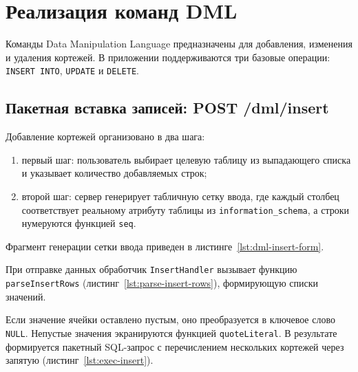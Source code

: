\section{Реализация команд DML}
\label{sec:dml}

Команды Data Manipulation Language предназначены для добавления, изменения и удаления кортежей. В приложении поддерживаются три базовые операции: \texttt{INSERT INTO}, \texttt{UPDATE} и \texttt{DELETE}.

\subsection{Пакетная вставка записей: POST /dml/insert}

Добавление кортежей организовано в два шага:
\begin{enumerate}
    \item первый шаг: пользователь выбирает целевую таблицу из выпадающего списка и указывает количество добавляемых строк;
    \item второй шаг: сервер генерирует табличную сетку ввода, где каждый столбец соответствует реальному атрибуту таблицы из \texttt{information\_schema}, а строки нумеруются функцией \texttt{seq}.
\end{enumerate}

Фрагмент генерации сетки ввода приведен в листинге~\ref{lst:dml-insert-form}.

\begin{listing}[H]
    \caption{Генерация динамической сетки ввода кортежей в \texttt{templates/dml.html}}
    \label{lst:dml-insert-form}
\end{listing}

При отправке данных обработчик \texttt{InsertHandler} вызывает функцию \texttt{parseInsertRows} (листинг~\ref{lst:parse-insert-rows}), формирующую списки значений.

\begin{listing}[H]
    \caption{Парсинг многострочных кортежей и экранирование в \texttt{handlers\_dml.go}}
    \label{lst:parse-insert-rows}
\end{listing}

Если значение ячейки оставлено пустым, оно преобразуется в ключевое слово \texttt{NULL}. Непустые значения экранируются функцией \texttt{quoteLiteral}. В результате формируется пакетный SQL-запрос с перечислением нескольких кортежей через запятую (листинг~\ref{lst:exec-insert}).

